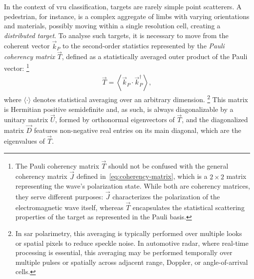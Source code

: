 In the context of \gls{vru} classification, targets are rarely simple point scatterers.
A pedestrian, for instance, is a complex aggregate of limbs with varying orientations and materials, possibly moving within a single resolution cell, creating a \emph{distributed target}.
To analyse such targets, it is necessary to move from the coherent vector $\vec k_P$ to the second-order statistics represented by the \emph{Pauli coherency matrix} $\vec T$, defined as a statistically averaged outer product of the Pauli vector:%
    \footnote{
        The Pauli coherency matrix $\vec T$ should not be confused with the general coherency matrix $\vec J$ defined in~\cref{eq:coherency-matrix}, which is a $2 \times 2$ matrix representing the wave's polarization state.
        While both are coherency matrices, they serve different purposes: $\vec J$ characterizes the polarization of the electromagnetic wave itself, whereas $\vec T$ encapsulates the statistical scattering properties of the target as represented in the Pauli basis.
    }
\begin{align}
    \label{eq:pauli-coherency-matrix}
    \vec T = \left\langle \vec k_P \cdot \vec k_P^\dagger \right\rangle,
\end{align}
where $\langle\cdot\rangle$ denotes statistical averaging over an arbitrary dimension.%
    \footnote{
        In \gls{sar} polarimetry, this averaging is typically performed over multiple looks or spatial pixels to reduce speckle noise.
        In automotive radar, where real-time processing is essential, this averaging may be performed temporally over multiple pulses or spatially across adjacent range, Doppler, or angle-of-arrival cells.
    }
This matrix is Hermitian positive semidefinite and, as such, is always diagonalizable by a unitary matrix $\vec U$, formed by orthonormal eigenvectors of $\vec T$, and the diagonalized matrix $\vec D$ features non-negative real entries on its main diagonal, which are the eigenvalues of $\vec T$.

